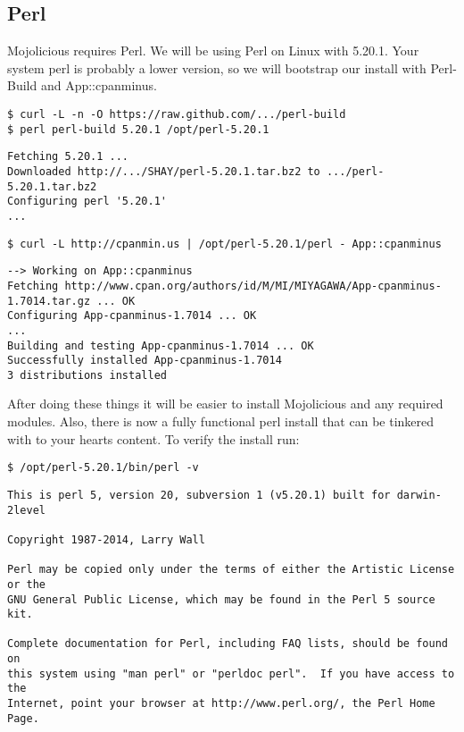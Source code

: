 \documentclass[17pt]{extreport}
\begin{document}
\subsection{Perl}

Mojolicious requires Perl.  We will be using Perl on Linux with 5.20.1.  Your
system perl is probably a lower version, so we will bootstrap our install with 
Perl-Build and App::cpanminus.

\begin{lstlisting}[style=BashInputStyle]
$ curl -L -n -O https://raw.github.com/.../perl-build
$ perl perl-build 5.20.1 /opt/perl-5.20.1
\end{lstlisting}

\begin{lstlisting}[style=BashOutputStyle]
Fetching 5.20.1 ...
Downloaded http://.../SHAY/perl-5.20.1.tar.bz2 to .../perl-5.20.1.tar.bz2
Configuring perl '5.20.1'
...
\end{lstlisting}

\begin{lstlisting}[style=BashInputStyle]
$ curl -L http://cpanmin.us | /opt/perl-5.20.1/perl - App::cpanminus
\end{lstlisting}

\begin{lstlisting}[style=BashOutputStyle]
--> Working on App::cpanminus
Fetching http://www.cpan.org/authors/id/M/MI/MIYAGAWA/App-cpanminus-1.7014.tar.gz ... OK
Configuring App-cpanminus-1.7014 ... OK
...
Building and testing App-cpanminus-1.7014 ... OK
Successfully installed App-cpanminus-1.7014
3 distributions installed
\end{lstlisting}

After doing these things it will be easier to install Mojolicious and any required modules.
Also, there is now a fully functional perl install that can be tinkered with to your hearts content.
To verify the install run:

\begin{lstlisting}[style=BashInputStyle]
$ /opt/perl-5.20.1/bin/perl -v
\end{lstlisting}

\begin{lstlisting}[style=BashOutputStyle]
This is perl 5, version 20, subversion 1 (v5.20.1) built for darwin-2level

Copyright 1987-2014, Larry Wall

Perl may be copied only under the terms of either the Artistic License or the
GNU General Public License, which may be found in the Perl 5 source kit.

Complete documentation for Perl, including FAQ lists, should be found on
this system using "man perl" or "perldoc perl".  If you have access to the
Internet, point your browser at http://www.perl.org/, the Perl Home Page.
\end{lstlisting}
\end{document}
